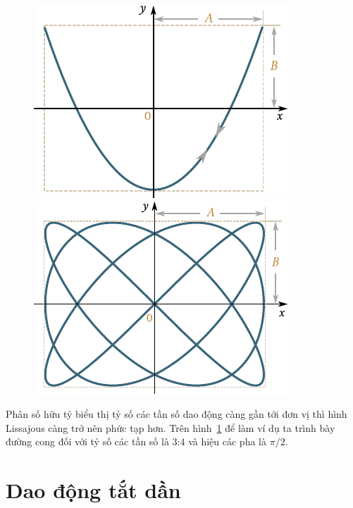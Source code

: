 \begin{figure}[!htb]
	\begin{minipage}[t]{0.5\linewidth}
		\begin{center}
			\includegraphics[scale=0.95]{figures/ch_07/fig_7_17.pdf}
			\caption[]{}
			\label{fig:7_17}
		\end{center}
	\end{minipage}
	\hspace{-0.05cm}
	\begin{minipage}[t]{0.5\linewidth}
		\begin{center}
			\includegraphics[scale=0.95]{figures/ch_07/fig_7_18.pdf}
			\caption[]{}
			\label{fig:7_18}
		\end{center}
	\end{minipage}
\end{figure}

Phân số hữu tỷ biểu thị tỷ số các tần số dao động càng gần tới đơn vị thì hình Lissajous càng trở nên phức tạp hơn. Trên hình~\ref{fig:7_18} để làm ví dụ ta trình bày đường cong đối với tỷ số các tần số là $3$:$4$ và hiệu các pha là $\pi/2$.

\section{Dao động tắt dần}\label{sec:7_10}

